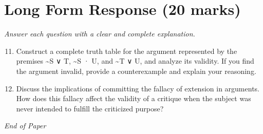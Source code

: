 \documentclass[12pt]{article}
\begin{document}
\section*{Long Form Response (20 marks)}
\textit{Answer each question with a clear and complete explanation.}
\begin{enumerate}[label=\arabic*.]
\setcounter{enumi}{10}
\item Construct a complete truth table for the argument represented by the premises \textasciitilde{}S ∨ T, \textasciitilde{}S · U, and \textasciitilde{}T ∨ U, and analyze its validity. If you find the argument invalid, provide a counterexample and explain your reasoning.
\item Discuss the implications of committing the fallacy of extension in arguments. How does this fallacy affect the validity of a critique when the subject was never intended to fulfill the criticized purpose?
\end{enumerate}

\vfill
\noindent\textit{End of Paper}
\end{document}
